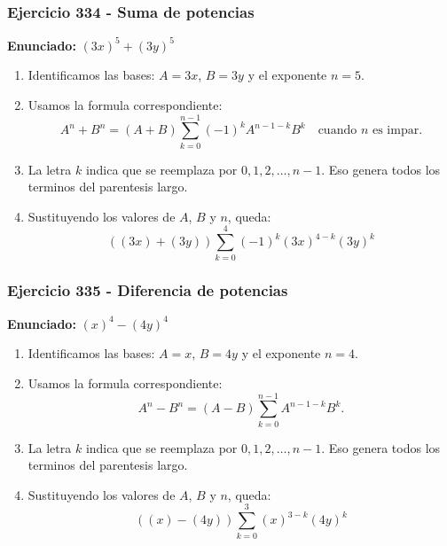 \documentclass[11pt,a4paper]{article}
\begin{document}
\subsubsection*{Ejercicio 334 - Suma de potencias}
\textbf{Enunciado:} $ \left(3 x\right)^{5}+\left(3 y\right)^{5} $\par
\begin{enumerate}[leftmargin=2em]
\item Identificamos las bases: \(A=3 x\), \(B=3 y\) y el exponente \(n=5\).
\item Usamos la formula correspondiente: \[A^n+B^n=(A+B)\sum_{k=0}^{n-1}(-1)^kA^{n-1-k}B^k\quad\text{cuando }n\text{ es impar}.\]
\item La letra \(k\) indica que se reemplaza por \(0,1,2,\ldots,n-1\). Eso genera todos los terminos del parentesis largo.
\item Sustituyendo los valores de \(A\), \(B\) y \(n\), queda: \[\boxed{\left(\left(3 x\right)+\left(3 y\right)\right)\sum_{k=0}^{4}(-1)^k\left(3 x\right)^{4-k}\left(3 y\right)^k}\]
\end{enumerate}

\vspace{0.2cm}
\subsubsection*{Ejercicio 335 - Diferencia de potencias}
\textbf{Enunciado:} $ \left(x\right)^{4}-\left(4 y\right)^{4} $\par
\begin{enumerate}[leftmargin=2em]
\item Identificamos las bases: \(A=x\), \(B=4 y\) y el exponente \(n=4\).
\item Usamos la formula correspondiente: \[A^n-B^n=(A-B)\sum_{k=0}^{n-1}A^{n-1-k}B^k.\]
\item La letra \(k\) indica que se reemplaza por \(0,1,2,\ldots,n-1\). Eso genera todos los terminos del parentesis largo.
\item Sustituyendo los valores de \(A\), \(B\) y \(n\), queda: \[\boxed{\left(\left(x\right)-\left(4 y\right)\right)\sum_{k=0}^{3}\left(x\right)^{3-k}\left(4 y\right)^k}\]
\end{enumerate}

\vspace{0.2cm}
\end{document}
